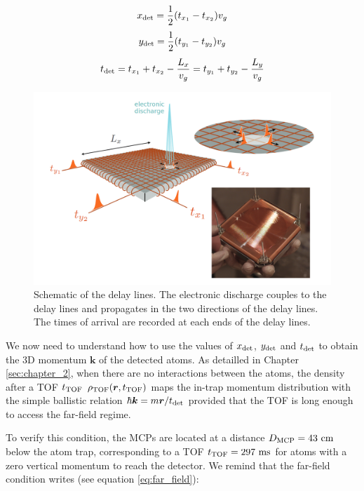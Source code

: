 \begin{equation}
    x_{\rm{det}}=\frac{1}{2} (t_{x_1}-t_{x_2})v_g
\end{equation}
\begin{equation}
    y_{\rm{det}}=\frac{1}{2} (t_{y_1}-t_{y_2})v_g
\end{equation}
\begin{equation}
    t_{\rm{det}}=t_{x_{1}}+t_{x_{2}}-\frac{L_{x}}{v_{g}}=t_{y_{1}}+t_{y_{2}}-\frac{L_{y}}{v_{g}}
    \label{eq:tdet_MCP}
\end{equation}

\begin{figure}[ht!]
    \centering
    \includegraphics[width=\textwidth]{Fig/Chapter3/delay_lines.png}
    \caption[Schematic of the delay lines]{Schematic of the delay lines. The electronic discharge couples to the delay lines and propagates in the two directions of the delay lines. The times of arrival are recorded at each ends of the delay lines.}
    \label{fig:delay_lines}
\end{figure}

We now need to understand how to use the values of $x_{\rm{det}}$, $y_{\rm{det}}$ and $t_{\rm{det}}$ to obtain the 3D momentum $\bm{k}$ of the detected atoms. As detailled in Chapter \ref{sec:chapter_2}, when there are no interactions between the atoms, the density after a TOF $t_{\rm{TOF}}$ $\rho_{\rm{TOF}} (\bm{r},t_{\rm{TOF}})$ maps the in-trap momentum distribution with the simple ballistic relation $\hbar \bm{k} = m \bm{r}/t_{\rm{det}}$ provided that the TOF is long enough to access the far-field regime. 

To verify this condition, the MCPs are located at a distance $D_{\rm{MCP}}=43 \ \rm{cm}$ below the atom trap, corresponding to a TOF $t_{\rm{TOF}}=297 \ \rm{ms}$ for atoms with a zero vertical momentum to reach the detector. We remind that the far-field condition writes (see equation \ref{eq:far_field}):

